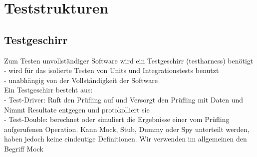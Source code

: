 \begin{figure}[hb]
	\centering
\end{figure}


\section{Teststrukturen}

\subsection{Testgeschirr}

Zum Testen unvollständiger Software wird ein Testgeschirr (testharness) benötigt
- wird für das isolierte Testen von Units und Integrationstests benutzt \\
- unabhängig von der Vollständigkeit der Software \\

Ein Testgeschirr besteht aus: \\
- Test-Driver: Ruft den Prüfling auf und Versorgt den Prüfling mit Daten und Nimmt Resultate entgegen und protokolliert sie \\
- Test-Double: berechnet oder simuliert die Ergebnisse einer vom Prüfling aufgerufenen Operation. Kann Mock, Stub, Dummy oder Spy unterteilt werden, haben jedoch keine eindeutige Definitionen. Wir verwenden im allgemeinen den Begriff Mock \\

\begin{figure}
	\centering
\end{figure}

